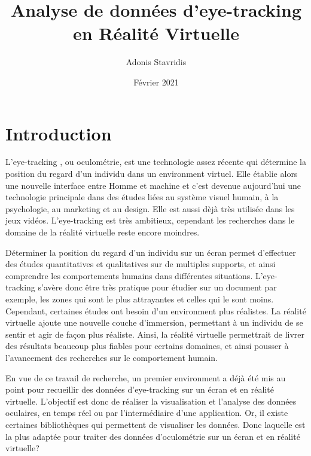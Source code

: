 \documentclass[12pt]{article}
\title{\textbf{Analyse de données d’eye-tracking en Réalité Virtuelle}}
\author{\Large{Adonis Stavridis}}
\date{Février 2021}
\begin{document}

\maketitle
\tableofcontents
\pagebreak


\section{Introduction}

L'eye-tracking \cite{wiki:eye_tracking}, ou oculométrie, est une technologie
assez récente qui détermine la position du regard d'un individu dans un
environment virtuel. Elle établie alors une nouvelle interface entre Homme et
machine et c'est devenue aujourd'hui une technologie principale dans des études
liées au système visuel humain, à la psychologie, au marketing et au design.
Elle est aussi dèjà très utilisée dans les jeux vidéos. L'eye-tracking est très
ambitieux, cependant les recherches dans le domaine de la réalité virtuelle
reste encore moindres.

\bigskip
Déterminer la position du regard d'un individu sur un écran permet d'effectuer
des études quantitatives et qualitatives sur de multiples supports, et ainsi
comprendre les comportements humains dans différentes situations. L'eye-tracking
s'avère donc être très pratique pour étudier sur un document par exemple, les
zones qui sont le plus attrayantes et celles qui le sont moins. Cependant,
certaines études ont besoin d'un environment plus réalistes. La réalité
virtuelle ajoute une nouvelle couche d'immersion, permettant à un individu de
se sentir et agir de façon plus réaliste. Ainsi, la réalité virtuelle
permettrait de livrer des résultats beaucoup plus fiables pour certains
domaines, et ainsi pousser à l'avancement des recherches sur le comportement
humain.

\bigskip
En vue de ce travail de recherche, un premier environment a déjà été mis au
point pour recueillir des données d'eye-tracking sur un écran et en réalité
virtuelle. L'objectif est donc de réaliser la visualisation et l'analyse des
données oculaires, en temps réel ou par l'intermédiaire d'une application. Or,
il existe certaines bibliothèques qui permettent de visualiser les données. Donc
laquelle est la plus adaptée pour traiter des données d'oculométrie sur un écran
et en réalité virtuelle?
\end{document}
